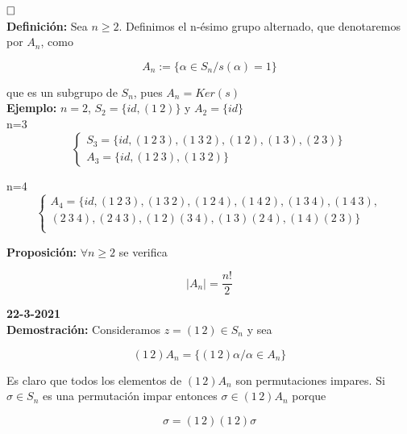 \documentclass{article}
\begin{document}
$\hfill\square$ \\

\textbf{Definición:} Sea $n\geq 2$. Definimos el n-ésimo grupo alternado, que denotaremos por $A_n$, como

\begin{equation*}
A_n:=\{\alpha\in S_n/s(\alpha)=1\}
\end{equation*}

que es un subgrupo de $S_n$, pues $A_n=Ker(s)$\\

\textbf{Ejemplo:} $n=2$, $S_2=\{id,(1\:2)\}$ y $A_2=\{id\}$ \\

n=3
\begin{equation*}
\left\lbrace \begin{array}{c}
S_3=\{id, (1\:2\:3),(1\:3\:2),(1\:2),(1\:3),(2\:3)\} \\
A_3=\{id,(1\:2\:3),(1\:3\:2)\}
\end{array} \right.
\end{equation*}

n=4
\begin{equation*}
\left\lbrace \begin{array}{c}
A_4=\{id, (1\:2\:3),(1\:3\:2),(1\:2\:4),(1\:4\:2),(1\:3\:4),(1\:4\:3), \\
(2\:3\:4),(2\:4\:3),(1\:2)(3\:4),(1\:3)(2\:4),(1\:4)(2\:3)\} \\
\end{array} \right.
\end{equation*}

\textbf{Proposición:} $\forall n \geq 2$ se verifica

\begin{equation*}
\left | A_n | \right. = \frac{n!}{2}
\end{equation*} 

\textbf{22-3-2021} \\

\textbf{Demostración:} Consideramos $z=(1\,2) \in S_n$ y sea

\begin{equation*}
(1\,2)A_n=\{(1\,2)\alpha / \alpha \in A_n\}
\end{equation*}

Es claro que todos los elementos de $(1\,2)A_n$ son permutaciones impares. Si $\sigma \in S_n$ es una permutación impar entonces $\sigma \in (1\,2)A_n$ porque

\begin{equation*}
\sigma=(1\,2)(1\,2)\sigma
\end{equation*}
\end{document}
